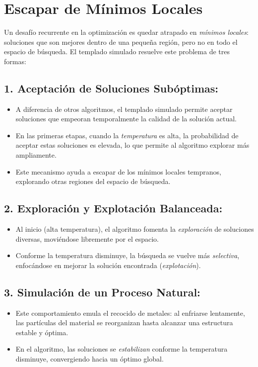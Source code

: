 \documentclass{article}
\begin{document}
\section{Escapar de Mínimos Locales}

Un desafío recurrente en la optimización es quedar atrapado en \textit{mínimos locales}: soluciones que son mejores dentro de una pequeña región, pero no en todo el espacio de búsqueda. El templado simulado resuelve este problema de tres formas:

\subsection{1. Aceptación de Soluciones Subóptimas:}
\begin{itemize}
    \item A diferencia de otros algoritmos, el templado simulado permite aceptar soluciones que empeoran temporalmente la calidad de la solución actual.
    \item En las primeras etapas, cuando la \textit{temperatura} es alta, la probabilidad de aceptar estas soluciones es elevada, lo que permite al algoritmo explorar más ampliamente.
    \item Este mecanismo ayuda a escapar de los mínimos locales tempranos, explorando otras regiones del espacio de búsqueda.
\end{itemize}

\subsection{2. Exploración y Explotación Balanceada:}
\begin{itemize}
    \item Al inicio (alta temperatura), el algoritmo fomenta la \textit{exploración} de soluciones diversas, moviéndose libremente por el espacio.
    \item Conforme la temperatura disminuye, la búsqueda se vuelve más \textit{selectiva}, enfocándose en mejorar la solución encontrada (\textit{explotación}).
\end{itemize}

\subsection{3. Simulación de un Proceso Natural:}
\begin{itemize}
    \item Este comportamiento emula el recocido de metales: al enfriarse lentamente, las partículas del material se reorganizan hasta alcanzar una estructura estable y óptima.
    \item En el algoritmo, las soluciones se \textit{estabilizan} conforme la temperatura disminuye, convergiendo hacia un óptimo global.
\end{itemize}
\end{document}
